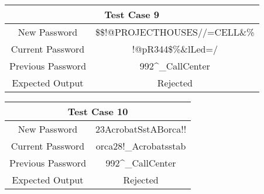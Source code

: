 \documentclass[12pt,letterpaper]{article}
\begin{document}
\begin{table}[h]
\begin{centering}
  \begin{tabular}{||c|c||}
  \hline
  \multicolumn{2}{||c||}{Test Case 9} \\
  \hline
  New Password & \$\$!@PROJECTHOUSES//=CELL\&\% \\
  \hline
  Current Password & !@pR344\$\%\&lLed=/ \\
  \hline
  Previous Password & 992\^{}\_CallCenter \\
  \hline
  Expected Output & Rejected \\
  \hline
  \end{tabular}
  \begin{tabular}{||c|c||}
  \hline
  \multicolumn{2}{||c||}{Test Case 10} \\
  \hline
  New Password & 23AcrobatSstABorca!! \\
  \hline
  Current Password & orca28!\_Acrobatsstab \\
  \hline
  Previous Password & 992\^{}\_CallCenter \\
  \hline
  Expected Output & Rejected \\
  \hline
  \end{tabular}



\end{centering}


\end{table}
\end{document}
